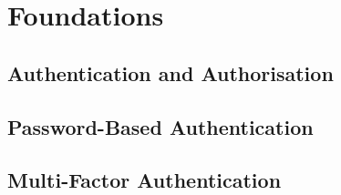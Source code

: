 
\section{Foundations}
\label{sec:foundations}

\subsection{Authentication and Authorisation}
\label{subsec:authn_authz}


\subsection{Password-Based Authentication}
\label{subsec:pw_based_authn}


\subsection{Multi-Factor Authentication}
\label{subsec:pw_based_authn}